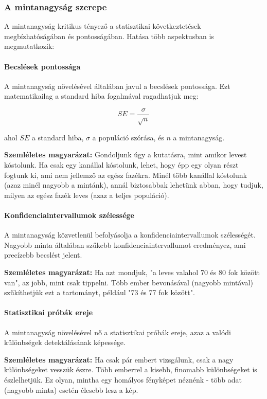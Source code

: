 \documentclass[a4paper,12pt]{article}
\begin{document}
    \subsubsection{A mintanagyság szerepe}

    A mintanagyság kritikus tényező a statisztikai következtetések megbízhatóságában és pontosságában. Hatása több aspektusban is megmutatkozik:

    \paragraph{Becslések pontossága}
    A mintanagyság növelésével általában javul a becslések pontossága. Ezt matematikailag a standard hiba fogalmával ragadhatjuk meg:

    \[ SE = \frac{\sigma}{\sqrt{n}} \]

    ahol $SE$ a standard hiba, $\sigma$ a populáció szórása, és $n$ a mintanagyság.

    \textbf{Szemléletes magyarázat:} Gondoljunk úgy a kutatásra, mint amikor levest kóstolunk. Ha csak egy kanállal kóstolunk, lehet, hogy épp egy olyan részt fogtunk ki, ami nem jellemző az egész fazékra. Minél több kanállal kóstolunk (azaz minél nagyobb a mintánk), annál biztosabbak lehetünk abban, hogy tudjuk, milyen az egész fazék leves (azaz a teljes populáció).

    \paragraph{Konfidenciaintervallumok szélessége}
    A mintanagyság közvetlenül befolyásolja a konfidenciaintervallumok szélességét. Nagyobb minta általában szűkebb konfidenciaintervallumot eredményez, ami precízebb becslést jelent.

    \textbf{Szemléletes magyarázat:} Ha azt mondjuk, "a leves valahol 70 és 80 fok között van", az jobb, mint csak tippelni. Több ember bevonásával (nagyobb mintával) szűkíthetjük ezt a tartományt, például "73 és 77 fok között".

    \paragraph{Statisztikai próbák ereje}
    A mintanagyság növelésével nő a statisztikai próbák ereje, azaz a valódi különbségek detektálásának képessége.

    \textbf{Szemléletes magyarázat:} Ha csak pár embert vizsgálunk, csak a nagy különbségeket vesszük észre. Több emberrel a kisebb, finomabb különbségeket is észlelhetjük. Ez olyan, mintha egy homályos fényképet néznénk - több adat (nagyobb minta) esetén élesebb lesz a kép.
\end{document}
